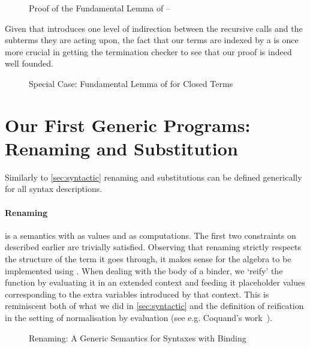 \begin{figure}[h]
\caption{Proof of the Fundamental Lemma of  -- \label{fig:genbody}}
\end{figure}

Given that  introduces one level of indirection between the recursive
calls and the subterms they are acting upon, the fact that our terms are indexed
by a  is once more crucial in getting the termination checker to see
that our proof is indeed well founded.


\begin{figure}[h]
\caption{Special Case: Fundamental Lemma of  for Closed Terms\label{fig:closedsem}}
\end{figure}


\section{Our First Generic Programs: Renaming and Substitution}\label{section:renandsub}

Similarly to \cref{sec:syntactic} renaming and substitutions can be defined generically
for all syntax descriptions.

\paragraph{Renaming} is a semantics with  as values and  as computations.
The first two constraints on  described earlier are trivially satisfied. Observing
that renaming strictly respects the structure of the term it goes through, it makes
sense for the algebra to be implemented using . When dealing with the body
of a binder, we `reify' the  function by evaluating it in an extended
context and feeding it placeholder values corresponding to the extra variables
introduced by that context. This is reminiscent both of what we did in
\cref{sec:syntactic} and the definition of reification in the setting of normalisation
by evaluation (see e.g. Coquand's work~\citeyear{coquand2002formalised}).

\begin{figure}[h]
\caption{Renaming: A Generic Semantics for Syntaxes with Binding\label{fig:genrensem}}
\end{figure}

